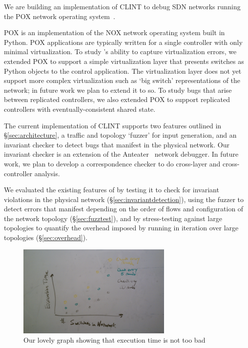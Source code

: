     We are building an implementation of CLINT to debug SDN networks running the POX network operating system~\cite{pox}.
    
    POX is an implementation of the NOX network operating system built in Python.
    POX applications are typically written for a single controller with only minimal virtualization.
    To study \projectname{}'s ability to capture virtualization errors, we extended POX
    to support a simple virtualization layer that presents switches as Python objects to the control application.
    The virtualization layer does not yet support more complex virtualization such as `big switch' representations 
    of the network; in future work we plan to extend it to so.
    To study bugs that arise between replicated controllers, we also extended POX to support replicated controllers
    with eventually-consistent shared state.

    The current implementation of CLINT supports two features outlined in \S\ref{sec:architecture}, a traffic and topology `fuzzer' for input generation, and an invariant checker to detect bugs that manifest in the physical network.
    Our invariant checker is an extension of the Anteater~\cite{anteater} network debugger.
    In future work, we plan to develop a correspondence checker to do cross-layer and cross-controller analysis.

    We evaluated the existing features of \projectname{} by testing it to check for invariant violations in the physical network (\S\ref{sec:invariantdetection}), using the fuzzer to detect errors that manifest depending on the order of flows and configuration of the network topology (\S\ref{sec:fuzztest}), and by stress-testing \projectname{} against large topologies to quantify the overhead imposed by running \projectname{} in iteration over large topologies (\S\ref{sec:overhead}). 


    \begin{figure}[t]
        \centering
        \includegraphics[width=3in]{../graphs/mock_overhead_graph.jpg}
        \caption[]{\label{fig:loop} Our lovely graph showing that execution time
        is not too bad\vspace{-10pt}} 
    \end{figure}

